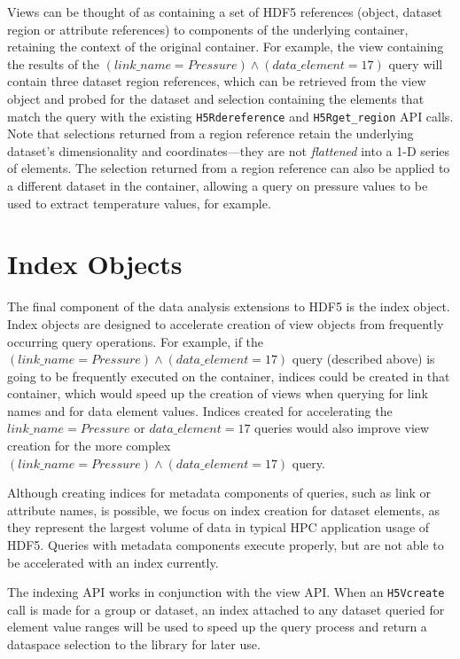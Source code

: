 \documentclass[letterpaper,hyper]{THG_RFC}
\begin{document}
Views can be thought of as containing a set of HDF5 references (object,
dataset region or attribute references) to components of the underlying
container, retaining the context of the original container. For example, the
view containing the results of the $(link\_name = Pressure)\land(data\_element = 17)$
query will contain three dataset region references, which
can be retrieved from the view object and probed for the dataset and selection
containing the elements that match the query with the existing \texttt{H5Rdereference}
and \texttt{H5Rget\_region} API calls. Note that selections returned from a region
reference retain the underlying dataset's dimensionality and coordinates---they
are not \textit{flattened} into a 1-D series of elements. The selection returned
from a region reference can also be applied to a different dataset in the container,
allowing a query on pressure values to be used to extract temperature values,
for example.

\section{Index Objects}
The final component of the data analysis extensions to HDF5 is the index object.
Index objects are designed to accelerate creation of view objects from
frequently occurring query operations.
For example, if the $(link\_name = Pressure)\land(data\_element = 17)$ query
(described above) is going to be frequently executed on the container, indices
could be created in that container, which would speed up the creation of views
when querying for link names and for data element values. Indices created for
accelerating the $link\_name = Pressure$ or $data\_element = 17$ queries
would also improve view creation for the more complex
$(link\_name = Pressure)\land(data\_element = 17)$ query.

Although creating indices for metadata components of queries, such as link or
attribute names, is possible, we focus on index creation for
dataset elements, as they represent the largest volume of data in typical HPC
application usage of HDF5. Queries with metadata components execute properly,
 but are not able to be accelerated
with an index currently.

The indexing API works in conjunction with the view API. When an \texttt{H5Vcreate}
call is made for a group or dataset, an index attached to any dataset queried
for element value ranges will be used to speed up the query process and return
a dataspace selection to the library for later use.
\end{document}
